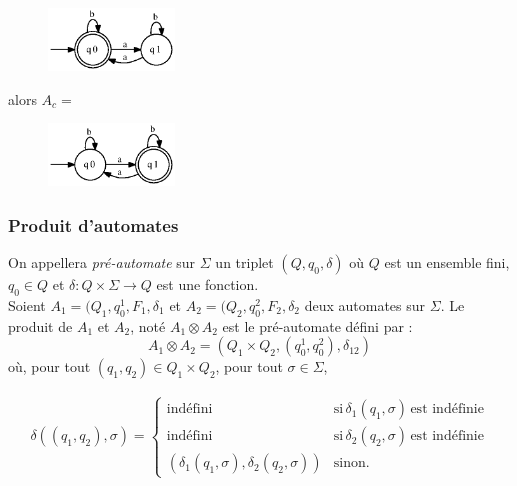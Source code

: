 \documentclass[a4paper]{article}
\begin{document}
  \begin{figure}[H]
    \begin{center}
      \includegraphics[width=0.3\textwidth]{fsa/fsa1.eps}
    \end{center}
  \end{figure}

  alors $A_c =$

  \begin{figure}[H]
    \begin{center}
      \includegraphics[width=0.3\textwidth]{fsa/fsa1_complement.eps}
    \end{center}
  \end{figure}

  \subsubsection{Produit d'automates}
  On appellera \textit{pré-automate} sur $\Sigma$ un triplet $(Q, q_0, 
\delta)$
  où $Q$ est un ensemble fini, $q_0 \in Q$ et $\delta : Q \times \Sigma 
\rightarrow Q$
  est une fonction.\\

  Soient $A_1 = (Q_1, q_0^1, F_1, \delta_1$ et $A_2 = (Q_2, q_0^2, F_2, 
\delta_2$
  deux automates sur $\Sigma$. Le produit de $A_1$ et $A_2$, noté $A_1 
\otimes A_2$
  est le pré-automate défini par : 
  $$ A_1 \otimes A_2 = (Q_1 \times Q_2, (q_0^1, q_0^2), \delta_{12})$$
  où, pour tout $(q_1, q_2) \in Q_1 \times Q_2$, pour tout $\sigma \in 
\Sigma$,

  \begin{center} 
    \begin{align*} 
     \delta((q_1, q_2), \sigma) = 
      \begin{cases}
        \text{indéfini} & \text{si}\, \delta_1(q_1, \sigma)\, \text{est 
indéfinie}\\
        \text{indéfini} & \text{si}\, \delta_2(q_2, \sigma)\, \text{est 
indéfinie}\\
        (\delta_1(q_1, \sigma), \delta_2(q_2, \sigma)) & \text{sinon}.
      \end{cases} 
    \end{align*} 
  \end{center} 
\end{document}
